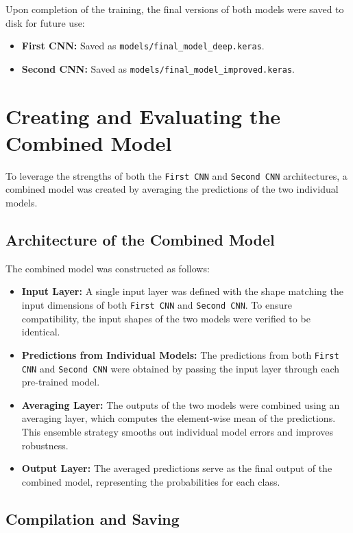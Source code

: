 \documentclass{article}
\begin{document}
Upon completion of the training, the final versions of both models were saved to disk for future use:
\begin{itemize}
    \item \textbf{First CNN:} Saved as \texttt{models/final\_model\_deep.keras}.
    \item \textbf{Second CNN:} Saved as \texttt{models/final\_model\_improved.keras}.
\end{itemize}

\section{Creating and Evaluating the Combined Model}

To leverage the strengths of both the \texttt{First CNN} and \texttt{Second CNN} architectures, a combined model was created by averaging the predictions of the two individual models.

\subsection{Architecture of the Combined Model}

The combined model was constructed as follows:
\begin{itemize}
    \item \textbf{Input Layer:} A single input layer was defined with the shape matching the input dimensions of both \texttt{First CNN} and \texttt{Second CNN}. To ensure compatibility, the input shapes of the two models were verified to be identical.
    \item \textbf{Predictions from Individual Models:} The predictions from both \texttt{First CNN} and \texttt{Second CNN} were obtained by passing the input layer through each pre-trained model.
    \item \textbf{Averaging Layer:} The outputs of the two models were combined using an averaging layer, which computes the element-wise mean of the predictions. This ensemble strategy smooths out individual model errors and improves robustness.
    \item \textbf{Output Layer:} The averaged predictions serve as the final output of the combined model, representing the probabilities for each class.
\end{itemize}

\subsection{Compilation and Saving}
\end{document}
